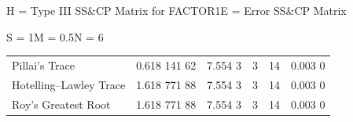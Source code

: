 \begin{mvframe}
\noindent H = Type III SS\&CP Matrix for FACTOR1\hfill E = Error SS\&CP Matrix

\vspace{4pt}
{\centering S = 1\quad M = 0.5\quad N = 6\par}
\vspace{10pt}

\noindent{}
\vspace{6pt}

\begin{tabular}{@{}lrrrrr@{}}
Pillai's Trace & 0.618 141 62 & 7.554 3 & 3 & 14 & 0.003 0\\
Hotelling--Lawley Trace & 1.618 771 88 & 7.554 3 & 3 & 14 & 0.003 0\\
Roy's Greatest Root & 1.618 771 88 & 7.554 3 & 3 & 14 & 0.003 0
\end{tabular}
\end{mvframe}
